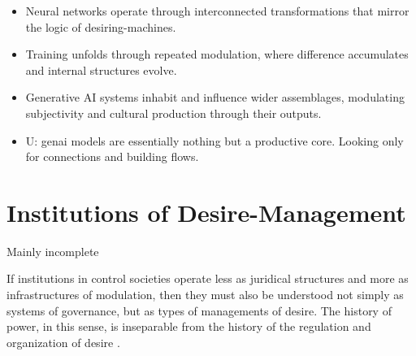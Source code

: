 \begin{orangebox}
	\begin{itemize}
		\item Neural networks operate through interconnected transformations that mirror the logic of desiring-machines.
		\item Training unfolds through repeated modulation, where difference accumulates and internal structures evolve.
		\item Generative AI systems inhabit and influence wider assemblages, modulating subjectivity and cultural production through their outputs.
		\item U: \gls{genai} models are essentially nothing but a productive core.
		      Looking only for connections and building flows.
	\end{itemize}
\end{orangebox}




\section{Institutions of Desire-Management}\label{sec:desiring-institutions}
\begin{orangebox}
	Mainly incomplete
\end{orangebox}





If institutions in control societies operate less as juridical structures and more as infrastructures of modulation, then they must also be understood not simply as systems of governance, but as types of managements of desire. The history of power, in this sense, is inseparable from the history of the regulation and organization of desire \parencite[139-145]{deleuze1983} .

